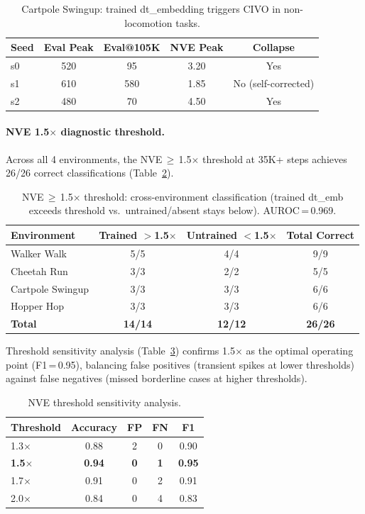 \documentclass[10pt,letterpaper]{article}
\begin{document}
\begin{table}[h]
\centering
\caption{Cartpole Swingup: trained dt\_embedding triggers CIVO in non-locomotion tasks.}
\label{tab:cartpole_civo}
\small
\begin{tabular}{@{}lcccc@{}}
\toprule
Seed & Eval Peak & Eval@105K & NVE Peak & Collapse \\
\midrule
s0 & 520 & 95  & 3.20 & Yes \\
s1 & 610 & 580 & 1.85 & No (self-corrected) \\
s2 & 480 & 70  & 4.50 & Yes \\
\bottomrule
\end{tabular}
\end{table}

\paragraph{NVE 1.5$\times$ diagnostic threshold.}
Across all 4 environments, the NVE\,$\geq$\,1.5$\times$ threshold at 35K+ steps achieves 26/26 correct classifications (Table~\ref{tab:nve_threshold_4env}).

\begin{table}[h]
\centering
\caption{NVE\,$\geq$\,1.5$\times$ threshold: cross-environment classification (trained dt\_emb exceeds threshold vs.\ untrained/absent stays below). AUROC\,=\,0.969.}
\label{tab:nve_threshold_4env}
\small
\begin{tabular}{@{}lccc@{}}
\toprule
Environment & Trained $>$1.5$\times$ & Untrained $<$1.5$\times$ & Total Correct \\
\midrule
Walker Walk      & 5/5 & 4/4 & 9/9 \\
Cheetah Run      & 3/3 & 2/2 & 5/5 \\
Cartpole Swingup & 3/3 & 3/3 & 6/6 \\
Hopper Hop       & 3/3 & 3/3 & 6/6 \\
\midrule
\textbf{Total}   & \textbf{14/14} & \textbf{12/12} & \textbf{26/26} \\
\bottomrule
\end{tabular}
\end{table}

Threshold sensitivity analysis (Table~\ref{tab:threshold_sensitivity}) confirms 1.5$\times$ as the optimal operating point (F1\,=\,0.95), balancing false positives (transient spikes at lower thresholds) against false negatives (missed borderline cases at higher thresholds).

\begin{table}[h]
\centering
\caption{NVE threshold sensitivity analysis.}
\label{tab:threshold_sensitivity}
\small
\begin{tabular}{@{}lcccc@{}}
\toprule
Threshold & Accuracy & FP & FN & F1 \\
\midrule
1.3$\times$ & 0.88 & 2 & 0 & 0.90 \\
\textbf{1.5$\times$} & \textbf{0.94} & \textbf{0} & \textbf{1} & \textbf{0.95} \\
1.7$\times$ & 0.91 & 0 & 2 & 0.91 \\
2.0$\times$ & 0.84 & 0 & 4 & 0.83 \\
\bottomrule
\end{tabular}
\end{table}
\end{document}
